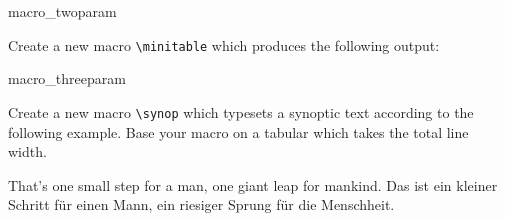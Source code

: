 \begin{dispExample}
\begin{texercise}{macro_twoparam}
\begin{tcboutputlisting}
\newcommand{\minitable}[2]{%
  \begin{center}\begin{tabular}{p{10cm}}\hline%
  \multicolumn{1}{c}{\bfseries#1}\\\hline%
  #2\\\hline%
  \end{tabular}\end{center}}
\end{tcboutputlisting}
\tcbuselistingtext%
Create a new macro \verb+\minitable+ which produces the
following output:\par\smallskip
\begin{tcbwritetemp}
\end{tcbwritetemp}
\tcbusetemplisting\par\smallskip\tcbusetemp%
\end{texercise}
\end{dispExample}


\begin{dispExample}
\begin{texercise}{macro_threeparam}
\begin{tcboutputlisting}
\newcommand{\synop}[3]{%
  \begin{tabular}{@{}p{(\linewidth-\tabcolsep*2-\arrayrulewidth)/2}|%
    p{(\linewidth-\tabcolsep*2-\arrayrulewidth)/2}@{}}\hline
  \multicolumn{2}{c}{\bfseries #1}\\\hline
  \multicolumn{1}{c|}{\itshape English}&
  \multicolumn{1}{c}{\itshape German}\\\hline
  #2 & #3
  \end{tabular}}
\end{tcboutputlisting}
\tcbuselistingtext%
Create a new macro \verb+\synop+ which typesets a synoptic text according
to the following example. Base your macro on a tabular which takes the
total line width.\par\smallskip
\begin{tcbwritetemp}
%
{That's one small step for a man, one giant leap for mankind.}%
{Das ist ein kleiner Schritt f\"{u}r einen Mann,
   ein riesiger Sprung f\"{u}r die Menschheit.}
\end{tcbwritetemp}
\tcbusetemplisting\par\smallskip\tcbusetemp%
\end{texercise}
\end{dispExample}

